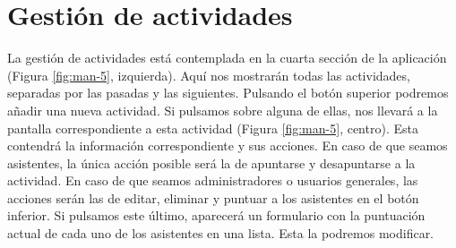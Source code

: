 \section{Gestión de actividades}

La gestión de actividades está contemplada en la cuarta sección de la aplicación (Figura \ref{fig:man-5}, izquierda). Aquí nos mostrarán todas las actividades, separadas por las pasadas y las siguientes. Pulsando el botón superior podremos añadir una nueva actividad. Si pulsamos sobre alguna de ellas, nos llevará a la pantalla correspondiente a esta actividad (Figura \ref{fig:man-5}, centro). Esta contendrá la información correspondiente y sus acciones. En caso de que seamos asistentes, la única acción posible será la de apuntarse y desapuntarse a la actividad. En caso de que seamos administradores o usuarios generales, las acciones serán las de editar, eliminar y puntuar a los asistentes en el botón inferior. Si pulsamos este último, aparecerá un formulario con la puntuación actual de cada uno de los asistentes en una lista. Esta la podremos modificar.

